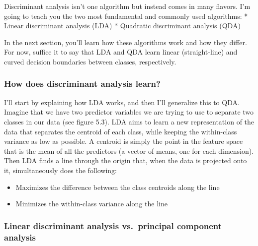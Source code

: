 \documentclass[
]{article}
\providecommand{\tightlist}{%
  \setlength{\itemsep}{0pt}\setlength{\parskip}{0pt}}
\begin{document}
Discriminant analysis isn't one algorithm but instead comes in many
flavors. I'm going to teach you the two most fundamental and commonly
used algorithms: * Linear discriminant analysis (LDA) * Quadratic
discriminant analysis (QDA)

In the next section, you'll learn how these algorithms work and how they
differ. For now, suffice it to say that LDA and QDA learn linear
(straight-line) and curved decision boundaries between classes,
respectively.

\subsubsection{How does discriminant analysis
learn?}\label{how-does-discriminant-analysis-learn}

I'll start by explaining how LDA works, and then I'll generalize this to
QDA. Imagine that we have two predictor variables we are trying to use
to separate two classes in our data (see figure 5.3). LDA aims to learn
a new representation of the data that separates the centroid of each
class, while keeping the within-class variance as low as possible. A
centroid is simply the point in the feature space that is the mean of
all the predictors (a vector of means, one for each dimension). Then LDA
finds a line through the origin that, when the data is projected onto
it, simultaneously does the following:

\begin{itemize}
\tightlist
\item
  Maximizes the difference between the class centroids along the line
\item
  Minimizes the within-class variance along the line
\end{itemize}

\subsubsection{Linear discriminant analysis vs.~principal component
analysis}\label{linear-discriminant-analysis-vs.-principal-component-analysis}
\end{document}
